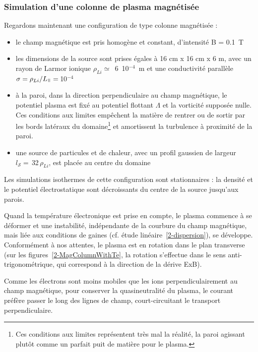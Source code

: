 \begin{refsection}
\subsubsection{Simulation d'une colonne de plasma magnétisée}
Regardons maintenant une configuration de type colonne magnétisée : 

\begin{itemize}
  \item le champ magnétique est pris homogène et constant, d'intensité B = 0.1~T
  \item les dimensions de la source sont prises égales à 16 cm x
  16 cm x 6 m, avec un rayon
  de Larmor ionique $\rho_{Li}\simeq$~6~10$^{-4}$~m et une conductivité
  parallèle $\sigma=\rho_{Li}/L_\para=\,$10$^{-4}$
  \item à la paroi, dans la direction perpendiculaire au champ magnétique, le
  potentiel plasma est fixé au potentiel flottant $\Lambda$ et la vorticité
  supposée nulle. Ces conditions aux limites empêchent la matière de
  rentrer ou de sortir par les bords latéraux du domaine\footnote{Ces
  conditions aux limites représentent très mal la réalité, la paroi agissant
  plutôt comme un parfait puit de matière pour le plasma.} et amortissent la
  turbulence à proximité de la paroi.
  \item une source de particules et de chaleur, avec un profil gaussien de
  largeur $l_{\mathcal S}=\,$32$\,\rho_{Li}$, est placée au centre du domaine
\end{itemize}

Les simulations isothermes de cette configuration sont stationnaires : la
densité et le potentiel électrostatique sont décroissants du centre de la
source jusqu'aux parois. 

Quand la température électronique est prise en compte,
le plasma commence à se déformer et une instabilité, indépendante de la
courbure du champ magnétique, mais liée aux conditions de gaines (cf. étude
linéaire~\eqref{2-dispersion}), se développe.
Conformément à nos attentes, le plasma est en rotation dans le plan transverse (sur les
figures~\ref{2-MagColumnWithTe}, la rotation s'effectue dans le sens
anti-trigonométrique, qui correspond à la direction de la dérive ExB).


Comme les électrons sont moins mobiles que les ions perpendiculairement au champ
magnétique, pour conserver
la quasineutralité du plasma, le courant préfère passer le long des lignes de
champ, court-circuitant le transport perpendiculaire.


\end{refsection}
